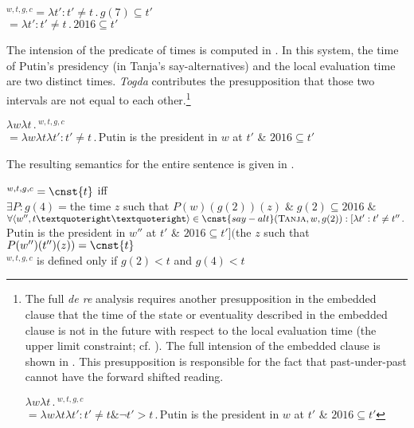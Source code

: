\documentclass[output=paper,modfonts,newtxmath,hidelinks]{langscibook}
\begin{document}
\ea {}$^{w,t,g,c}$\tabto{2.3cm}${}=\lambda t':t'\neq t\,.\,g(7)\subseteq t'$\smallskip\\
\tabto{2.3cm}${}=\lambda t':t'\neq t\,.\,2016\subseteq t'$\label{20:ex38}
\z

\noindent The intension of the predicate of times is computed in . In this system, the time of Putin’s presidency (in Tanja’s say-alternatives) and the local evaluation time are two distinct times. \textit{Togda} contributes the presupposition that those two intervals are not equal to each other.\footnote{\label{20:fn11}The full \textit{de re} analysis requires another presupposition in the embedded clause that the time of the state or eventuality described in the embedded clause is not in the future with respect to the local evaluation time (the upper limit constraint; cf. \citealt{Abusch1997}). The full intension of the embedded clause is shown in . This presupposition is responsible for the fact that past-under-past cannot have the forward shifted reading.

\ea $\lambda w\lambda t\,.\,$$^{w,t,g,c}$\\
\hspace{0.5cm}${}=\lambda w\lambda t\lambda t':t'\neq t \&\neg t'>t\,.\,{}$Putin is the president in $w$ at $t'$ \& $2016\subseteq t'$\label{20:fnex1}
\z
}

\ea $\lambda w\lambda t\,.\,$$^{w,t,g,c}$\smallskip\\
\hspace{0.5cm}${}=\lambda w\lambda t\lambda t':t'\neq t\,.\,{}$Putin is the president in $w$ at $t'$ \& $2016\subseteq t'$\label{20:ex39}
\z

\noindent The resulting semantics for the entire sentence is given in .

\ea {}$^{w,t,g,c}=\cnst{t}$ iff\smallskip\\
$\exists P:g(4)={}$the time $z$ such that $P(w)(g(2))(z)\;\&\;g(2)\subseteq 2016\;\&$\\
$\forall\langle w'',t’’\rangle\in\cnst{say-alt}(\textsc{Tanja},w,g(2)): [\lambda t':t'\neq t''\,.\,{}$Putin is the president in $w''$ at $t'$ \& $2016\subseteq t']($the $z$ such that $P(w'')(t'')(z)) =\cnst{t}$\medskip\\
$^{w,t,g,c}$  is defined only if $g(2)<t$ and $g(4)<t$\label{20:ex40}
\z
\end{document}
